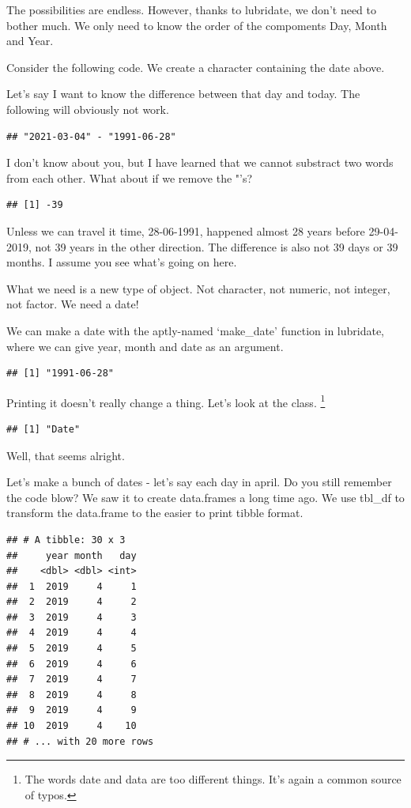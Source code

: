\documentclass[]{tufte-book}
\begin{document}
The possibilities are endless. However, thanks to lubridate, we don't need to bother much. We only need to know the order of the compoments Day, Month and Year.

Consider the following code. We create a character containing the date above.

Let's say I want to know the difference between that day and today. The following will obviously not work.

\begin{verbatim}
## "2021-03-04" - "1991-06-28"
\end{verbatim}

I don't know about you, but I have learned that we cannot substract two words from each other. What about if we remove the "'s?

\begin{verbatim}
## [1] -39
\end{verbatim}

Unless we can travel it time, 28-06-1991, happened almost 28 years before 29-04-2019, not 39 years in the other direction. The difference is also not 39 days or 39 months. I assume you see what's going on here.

What we need is a new type of object. Not character, not numeric, not integer, not factor. We need a date!

We can make a date with the aptly-named `make\_date' function in lubridate, where we can give year, month and date as an argument.

\begin{verbatim}
## [1] "1991-06-28"
\end{verbatim}

Printing it doesn't really change a thing. Let's look at the class. \footnote{The words date and data are too different things. It's again a common source of typos.}

\begin{verbatim}
## [1] "Date"
\end{verbatim}

Well, that seems alright.

Let's make a bunch of dates - let's say each day in april. Do you still remember the code blow? We saw it to create data.frames a long time ago. We use tbl\_df to transform the data.frame to the easier to print tibble format.

\begin{verbatim}
## # A tibble: 30 x 3
##     year month   day
##    <dbl> <dbl> <int>
##  1  2019     4     1
##  2  2019     4     2
##  3  2019     4     3
##  4  2019     4     4
##  5  2019     4     5
##  6  2019     4     6
##  7  2019     4     7
##  8  2019     4     8
##  9  2019     4     9
## 10  2019     4    10
## # ... with 20 more rows
\end{verbatim}
\end{document}
